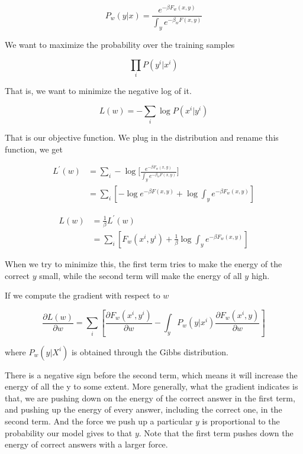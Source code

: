 \begin{equation*}
    P_w(y|x) = \frac{e^{-\beta F_w(x,y)}}{\int_y e^{-\beta_w F(x,y)}}
\end{equation*}

We want to maximize the probability over the training samples

\begin{equation*}
    \prod_{i} P(y^i|x^i)
\end{equation*}

That is, we want to minimize the negative log of it.

\begin{equation*}
    L(w) = -\sum_i \log P(x^i | y^i)
\end{equation*}

That is our objective function. We plug in the distribution and rename this function, we get

\begin{equation*}
    \begin{split}
        L^{'}(w) & = \sum_i -\log \bigg\lbrack\frac{e^{-\beta F_w(x,y)}}{\int_y e^{-\beta_w F(x,y)}}\bigg\rbrack \\
        & = \sum_i [-\log e^{-\beta F(x,y)} + \log\int_y e^{-\beta F_w(x,y)}]
    \end{split}
\end{equation*}

\begin{equation*}
    \begin{split}
        L(w) & = \frac{1}{\beta}L^{'}(w) \\
        & = \sum_i [F_w (x^i,y^i) + \frac{1}{\beta}\log\int_y e^{-\beta F_w(x,y)}]
    \end{split}
\end{equation*}

When we try to minimize this, the first term tries to make the energy of the correct $y$ small, while the second term will make the energy of all $y$ high. 

If we compute the gradient with respect to $w$

\begin{equation*}
    \frac{\partial L(w)}{\partial w} = \sum_{i} [\frac{\partial F_{w}(x^i,y^i)}{\partial w} - \int_y P_{w}(y|x^i)\frac{\partial F_w(x^i,y)}{\partial w}]
\end{equation*}

where $P_w(y|X^i)$ is obtained through the Gibbs distribution.

There is a negative sign before the second term, which means it will increase the energy of all the y to some extent. 
More generally, what the gradient indicates is that, we are pushing down on the energy of the correct answer in the first term, and pushing up the energy of every answer, including the correct one, in the second term. 
And the force we push up a particular $y$ is proportional to the probability our model gives to that $y$. Note that the first term pushes down the energy of correct answers with a larger force.

